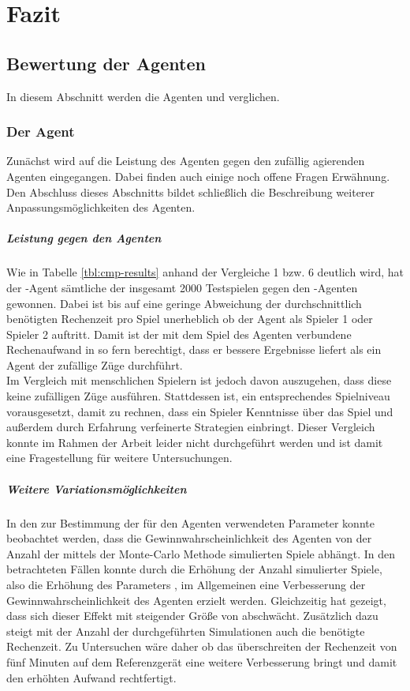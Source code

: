 \chapter{Fazit}
\label{Fazit}

\section{Bewertung der Agenten}
In diesem Abschnitt werden die Agenten  und  verglichen. 
\subsection{Der Agent }
Zunächst wird auf die Leistung des Agenten  gegen den zufällig agierenden Agenten eingegangen. Dabei finden auch einige noch offene Fragen Erwähnung. Den Abschluss dieses Abschnitts bildet schließlich die Beschreibung weiterer Anpassungsmöglichkeiten des Agenten.  
\paragraph{Leistung gegen den Agenten }
Wie in Tabelle \ref{tbl:cmp-results} anhand der Vergleiche 1 bzw. 6 deutlich wird, hat der -Agent sämtliche der insgesamt 2000 Testspielen gegen den -Agenten gewonnen. Dabei ist bis auf eine geringe Abweichung der durchschnittlich benötigten Rechenzeit pro Spiel unerheblich ob der Agent als Spieler 1 oder Spieler 2 auftritt. Damit ist der mit dem Spiel des Agenten verbundene Rechenaufwand in so fern berechtigt, dass er bessere Ergebnisse liefert als ein Agent der zufällige Züge durchführt.
\\Im Vergleich mit menschlichen Spielern ist jedoch davon auszugehen, dass diese keine zufälligen Züge ausführen. Stattdessen ist, ein entsprechendes Spielniveau vorausgesetzt, damit zu rechnen, dass ein Spieler Kenntnisse über das Spiel und außerdem durch Erfahrung verfeinerte Strategien einbringt. Dieser Vergleich konnte im Rahmen der Arbeit leider nicht durchgeführt werden und ist damit eine Fragestellung für weitere Untersuchungen.  
\paragraph{Weitere Variationsmöglichkeiten}
In den zur Bestimmung der für den Agenten verwendeten Parameter konnte beobachtet werden, dass die Gewinnwahrscheinlichkeit des Agenten von der Anzahl der mittels der Monte-Carlo Methode simulierten Spiele abhängt. In den betrachteten Fällen konnte durch die Erhöhung der Anzahl simulierter Spiele, also die Erhöhung des Parameters , im Allgemeinen eine Verbesserung der Gewinnwahrscheinlichkeit des Agenten erzielt werden. Gleichzeitig hat \cite{nijssen_2007} gezeigt, dass sich dieser Effekt mit steigender Größe von  abschwächt. Zusätzlich dazu steigt mit der Anzahl der durchgeführten Simulationen auch die benötigte Rechenzeit. Zu Untersuchen wäre daher ob das überschreiten der Rechenzeit von fünf Minuten auf dem Referenzgerät eine weitere Verbesserung bringt und damit den erhöhten Aufwand rechtfertigt.

